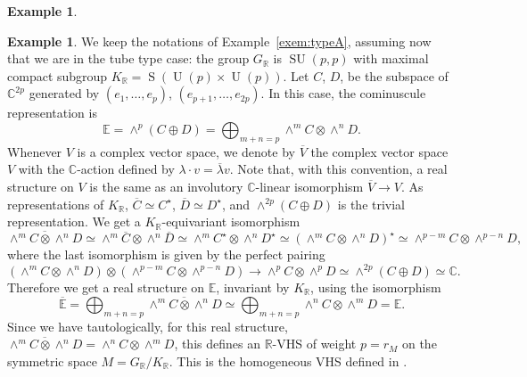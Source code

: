 \documentclass[10pt]{amsart}
\theoremstyle{plain}
\theoremstyle{definition}
\newtheorem{exem}[theo]{Example}
\let\ov\overline
\DeclareMathOperator{\rS}{S}
\DeclareMathOperator{\SU}{SU}
\DeclareMathOperator{\rU}{U}
\newcommand{\bC}{\mathbb{C}}
\newcommand{\bE}{\mathbb{E}}
\newcommand{\bR}{\mathbb{R}}
\newcommand{\rkm}{{r_M}}
\begin{document}
\begin{exem}
\begin{exem}
We keep the notations of Example~\ref{exem:typeA}, assuming now that we are in the tube type
case: the group
$G_\bR$ is $\SU(p,p)$ with maximal compact subgroup $K_\bR=\rS(\rU(p)\times\rU(p))$. Let $C$,
\resp $D$, be the subspace of $\bC^{2p}$ generated by $(e_1,\ldots,e_p)$,
\resp $(e_{p+1},\ldots,e_{2p})$. In this
case, the cominuscule representation is
$$\bE=\wedge^p(C\oplus D)=\bigoplus_{m+n=p}\wedge^m C\otimes\wedge^n D.$$
Whenever $V$ is a complex vector space, we denote by $\ov{V}$ the complex vector space
$V$ with the $\bC$-action defined by $\lambda \cdot v = \ov{\lambda}v$. Note that, with this
convention, a real structure on $V$ is the same as an involutory $\bC$-linear isomorphism
$\ov{V} \to V$.
As representations of
$K_\bR$, $\ov{C}\simeq C^\star$, $\ov{D}\simeq D^\star$, and
$\wedge^{2p}(C\oplus D)$ is
the trivial representation.
We get a $K_\bR$-equivariant isomorphism
$$
\ov{\wedge^m C \otimes \wedge^n D} \simeq \wedge^m \ov C \otimes \wedge^n \ov D
\simeq \wedge^m C^\star \otimes \wedge^n D^\star \simeq (\wedge^m C \otimes \wedge^n D)^\star
\simeq \wedge^{p-m} C \otimes \wedge^{p-n} D,
$$
where the last isomorphism is given by the perfect pairing
$$
(\wedge^m C \otimes \wedge^n D) \otimes (\wedge^{p-m}C \otimes \wedge^{p-n}D) \to
\wedge^p C \otimes \wedge^p D \simeq \wedge^{2p} (C \oplus D) \simeq \bC.
$$
Therefore we get a real
structure on $\bE$, invariant by $K_\bR$, using the isomorphism
$$\ov{\bE}=\bigoplus_{m+n=p} \ov{\wedge^m C \otimes\wedge^n D}
\simeq \bigoplus_{m+n=p} \wedge^n C\otimes\wedge^m D = \bE.$$
Since we have tautologically, for this real structure,
$\ov{\wedge^m C \otimes\wedge^n D} = \wedge^n C\otimes\wedge^m D$,
this defines an $\bR$-VHS of weight $p=\rkm$ on the symmetric space
$M=G_\bR/K_\bR$. This is the homogeneous VHS defined in \cite{Gross}.


\end{exem}
\end{exem}
\end{document}
